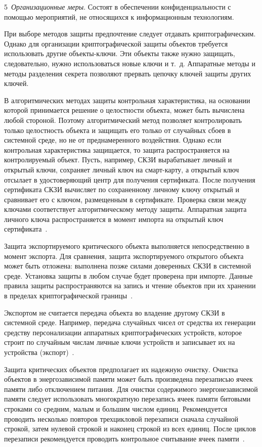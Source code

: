 5~{\it Организационные меры}. 
Состоят в обеспечении конфиденциальности с помощью мероприятий,
не относящихся к информационным технологиям.

При выборе методов защиты предпочтение следует отдавать криптографическим. 
Однако для организации криптографической защиты объектов требуется использовать 
другие объекты-ключи. Эти объекты также нужно защищать, следовательно, нужно 
использоваться новые ключи и т.~д. Аппаратные методы и методы разделения 
секрета позволяют прервать цепочку ключей защиты других ключей.

В алгоритмических методах защиты контрольная характеристика, 
на основании которой принимается решение о целостности объекта, 
может быть вычислена любой стороной. Поэтому алгоритмический метод позволяет 
контролировать только целостность объекта и защищать его только от случайных 
сбоев в системной среде, но не от преднамеренного воздействия. 
%
Однако если контрольная характеристика защищается, то защита распространяется
на контролируемый объект. 
%
Пусть, например, СКЗИ вырабатывает личный и открытый ключи,
сохраняет личный ключ на смарт-карту, 
а открытый ключ отсылает в удостоверяющий центр для получения сертификата. 
%
После получения сертификата СКЗИ вычисляет по сохраненному личному ключу 
открытый и сравнивает его с ключом, размещенным в сертификате.
%
Проверка связи между ключами соответствует алгоритмическому методу защиты.
Аппаратная защита личного ключа распространяется в момент импорта
на открытый ключ сертификата~.

Защита экспортируемого критического объекта выполняется непосредственно в момент
экспорта. Для сравнения, защита экспортируемого открытого объекта может быть
отложена: выполнена позже силами доверенных СКЗИ в системной среде.
%
Установка защиты в любом случае будет проверена при импорте. 
%
Данные правила защиты распространяются на запись и чтение объектов при 
их хранении в пределах криптографической границы~. 

Экспортом не считается передача объекта во владение другому СКЗИ в системной
среде.
%
Например, передача случайных чисел от средства их генерации средству
персонализации аппаратных криптографических устройств, которое строит по 
случайным числам личные ключи устройств и записывает их на устройства
(экспорт)~. 

Защита критических объектов предполагает их надежную очистку.
%
Очистка объектов в энергозависимой памяти может быть произведена перезаписью 
ячеек памяти либо отключением питания.
%
Для очистки содержимого энергонезависимой памяти следует использовать
многократную перезапись ячеек памяти битовыми строками со средним, малым и 
большим числом единиц. Рекомендуется проводить несколько повторов трехцикловой 
перезаписи сначала случайной строкой, затем нулевой строкой и 
наконец строкой из всех единиц. 
%
После циклов перезаписи рекомендуется проводить контрольное считывание ячеек 
памяти~.

